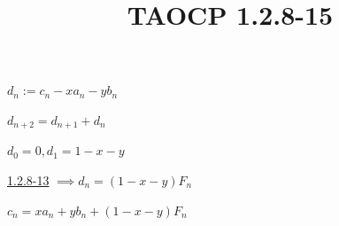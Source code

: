 \documentclass{article}
\title{TAOCP 1.2.8\mbox{-}15}
\begin{document}
\maketitle

\( d_{n} := c_{n} - xa_{n} - yb_{n} \)

\( d_{n+2} = d_{n+1} + d_{n} \)

\( d_{0} = 0, d_{1} = 1 - x - y \)

\href{./1.2.8-13.pdf}{1.2.8\mbox{-}13} \( \implies d_{n} = (1-x-y)F_{n} \)

\( c_{n} = xa_{n} + yb_{n} + (1-x-y)F_{n} \)
\end{document}
